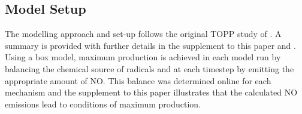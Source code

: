 \subsection{Model Setup} \label{ss:model_setup}

The modelling approach and set-up follows the original TOPP study of \citet{Butler:2011}.
A summary is provided with further details in the supplement to this paper and \citet{Butler:2011}. 
Using a box model, maximum  production is achieved in each model run by balancing the chemical source of radicals and  at each timestep by emitting the appropriate amount of NO.
This balance was determined online for each mechanism and the supplement to this paper illustrates that the calculated NO emissions lead to conditions of maximum  production.

